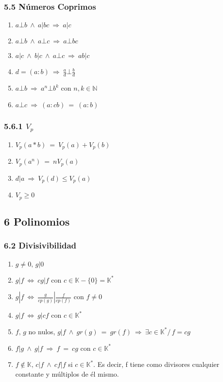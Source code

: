 \documentclass{article}
\newcommand{\lands}{\:\land\:}                          %
\newcommand{\comma}{,\,}                                %
\newcommand{\tq}{/\,}                                   %
\newcommand{\eq}{\:=\:}                                 %
\newcommand{\naturales}{\mathbb{N}}                     %
\newcommand{\cuerpo}{\mathbb{K}}                        %
\newcommand{\Rightarrows}{\: \Rightarrow \:}            %
\newcommand{\Leftrightarrows}{\: \Leftrightarrow \:}    %
\begin{document}
\subsubsection*{5.5 Números Coprimos}
\begin{enumerate}
    \item $a \bot b \lands a | bc \Rightarrows a |c$
    \item $a \bot b \lands a \bot c \Rightarrows a \bot bc$
    \item $a|c \lands b|c \lands a \bot c \Rightarrows ab|c$
    \item $d = (a:b) \Rightarrows \frac{a}{d} \bot \frac{b}{d}$
    \item $a \bot b \Rightarrows a^n \bot b^k$ con $n, k \in \naturales$
    \item $a \bot c \Rightarrows (a:cb) \eq (a:b)$
\end{enumerate}
\subsubsection*{5.6.1 $V_p$}
\begin{enumerate}
    \item $V_p(a*b) \eq V_p(a) + V_p(b)$
    \item $V_p(a^n) \eq nV_p(a)$
    \item $d|a \Rightarrows V_p(d) \leq V_p(a)$
    \item $V_p \geq 0$
\end{enumerate}

\subsection*{6 Polinomios}
\subsubsection*{6.2 Divisivibilidad}
\begin{enumerate}
    \item $g\neq 0 \comma g|0$
    \item $g | f \Leftrightarrows cg | f$ con $c \in \cuerpo - \{0\} = \cuerpo^*$
    \item $g|f \Leftrightarrows \frac{g}{cp(g)} | \frac{f}{cp(f)}$ con $f\neq 0$
    \item $g|f \Leftrightarrows g|cf$ con $c \in \cuerpo^*$
    \item $f \comma g$ no nulos, $g|f \lands gr(g) \eq gr(f) \Rightarrows \exists c \in \cuerpo^* \tq f=cg$
    \item $f|g \lands g|f \Rightarrows f \eq cg$ con $c \in \cuerpo^*$
    \item $f \notin \cuerpo \comma c|f \lands cf|f$ si $c \in \cuerpo^*$. Es decir, f tiene como divisores cualquier constante y múltiplos de él mismo.
\end{enumerate}
\end{document}
